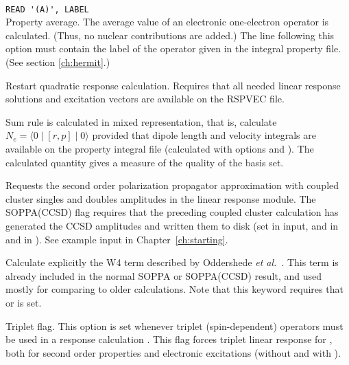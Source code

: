 \begin{description}
\item{} \\
\verb|READ '(A)', LABEL|\\
Property average.
The average value of an electronic one-electron
operator is calculated.
(Thus, no nuclear contributions are added.)
The line following this option must contain the
label of the operator given in the integral property file.
(See section \ref{ch:hermit}.)

\item{}
Restart quadratic response
calculation.
Requires that all needed linear response solutions and excitation vectors
are available on the RSPVEC file.

\item{}
Sum rule is calculated in mixed representation, that is, calculate
$N_e=\langle0\mid [r,p] \mid0\rangle$ provided that dipole length and
velocity integrals are available on the property integral file 
(calculated with  options  and ).
The calculated quantity gives a measure of the quality of the basis
set.

\item{}
Requests the second order polarization propagator approximation with coupled 
cluster singles and doubles amplitudes in the linear response module.
The SOPPA(CCSD)
 flag requires that the preceding coupled cluster 
calculation has generated the CCSD amplitudes and written them to disk 
(set  in 
 input,  and  in   and 
 in ). See example input in 
Chapter~\ref{ch:starting}.

\item{}
Calculate explicitly the W4 term described by Oddershede {\it et
al.\/}~\cite{jopjdycpr2}. This term is already included in the normal
SOPPA or 
SOPPA(CCSD) result, and used mostly for comparing to older
calculations. Note that this keyword requires that  or 
is set.

\item{}
Triplet flag. This option is set whenever triplet
(spin-dependent)
operators must be used in a response calculation
\cite{jodlypjjcp91,ovhapjhjajthjojcp97}.
This flag forces triplet linear response for ,
both for second order properties and electronic excitations
(without and with ).

\end{description}

